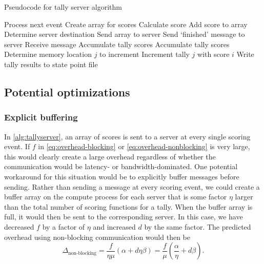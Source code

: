 \begin{algorithm}
  \caption{Pseudocode for tally server algorithm}
  \label{alg:tallyserver}
  \begin{algorithmic}
            \State Process next event
              \State Create array for scores
                \State Calculate score
                \State Add score to array
              \EndFor
              \State Determine server destination
              \State Send array to server
            \EndIf
          \EndWhile
        \EndFor
        \State Send `finished' message to server
      \EndFor
      \Loop
        \State Receive message
          \State Accumulate tally scores
          \State Accumulate tally scores
        \Else
          \State Determine memory location $j$ to increment
          \State Increment tally $j$ with score $i$
          \EndFor
        \EndIf
      \EndLoop
      \State Write tally results to state point file
    \EndIf
  \end{algorithmic}
\end{algorithm}

\subsection{Potential optimizations}

\subsubsection{Explicit buffering}

In \autoref{alg:tallyserver}, an array of scores is sent to a server at every
single scoring event. If $f$ in \eqref{eq:overhead-blocking} or
\eqref{eq:overhead-nonblocking} is very large, this would clearly create a large
overhead regardless of whether the communication would be latency- or
bandwidth-dominated. One potential workaround for this situation would be to
explicitly buffer messages before sending. Rather than sending a message at
every scoring event, we could create a buffer array on the compute process for
each server that is some factor $\eta$ larger than the total number of scoring
functions for a tally. When the buffer array is full, it would then be sent to
the corresponding server. In this case, we have decreased $f$ by a factor of
$\eta$ and increased $d$ by the same factor. The predicted overhead using
non-blocking communication would then be
\begin{equation}
  \label{eq:overhead-nonblocking-buffer}
  \Delta_{\text{non-blocking}} = \frac{f}{\eta\mu} \left ( \alpha + d\eta\beta
  \right ) = \frac{f}{\mu} \left ( \frac{\alpha}{\eta} + d\beta \right ).
\end{equation}

